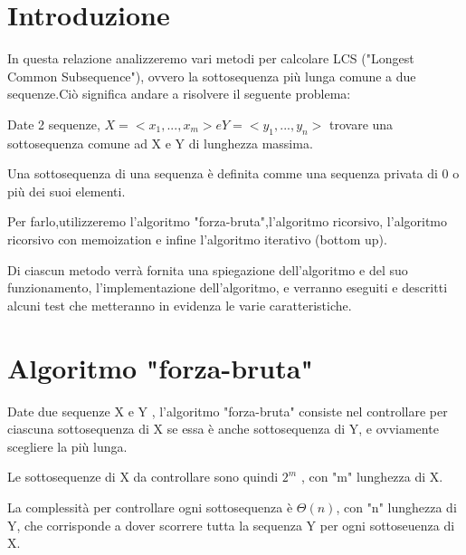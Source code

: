 \documentclass[11pt,a4paper]{article}
\begin{document}
\newcommand{\imageLabel}[4]{ %
	\begin{figure}[h!]
		\centering
		\texttt{[image: \#1]} 
		\caption{#2}
		\label{fig:#4}
	\end{figure}
	\FloatBarrier
}
\renewcommand{\figurename}{Figura}
\renewcommand{\tablename}{Tabella}

\newcommand{\titolo}  {Laboratorio di Algoritmi

e Strutture Dati}
\newcommand{\sottotitolo} {Confronto metodi per calcolare LCS tra due stringhe}
\newcommand{\nome}    {Federico Donati}







\section {Introduzione}
In questa relazione analizzeremo vari metodi per calcolare LCS ("Longest Common Subsequence"), ovvero la sottosequenza più lunga comune a due sequenze.Ciò significa andare a risolvere il seguente problema:

Date 2 sequenze, $X =< x_{1}, . . . , x_{m} > e Y =< y_{1}, . . . , y_{n} >$
trovare una sottosequenza comune ad X e Y di lunghezza massima.

Una sottosequenza di una sequenza è definita comme una sequenza privata di 0 o più dei suoi elementi.

Per farlo,utilizzeremo l'algoritmo "forza-bruta",l'algoritmo ricorsivo, l'algoritmo ricorsivo con memoization e infine l'algoritmo iterativo (bottom up).

Di ciascun metodo verrà fornita una spiegazione dell'algoritmo e del suo funzionamento, l'implementazione dell'algoritmo, e verranno eseguiti e descritti alcuni test che metteranno in evidenza le varie caratteristiche. 

\section {Algoritmo "forza-bruta"}
\label{bruteforce cap}
Date due sequenze X e Y , l'algoritmo "forza-bruta" consiste nel controllare per ciascuna sottosequenza di X se essa è anche sottosequenza di Y, e ovviamente scegliere la più lunga.

Le sottosequenze di X da controllare sono quindi $2^m$ , con "m" lunghezza di X.

La complessità per controllare ogni sottosequenza è $\Theta(n)$, con "n" lunghezza di Y, che corrisponde a dover scorrere tutta la sequenza Y per ogni sottoseuenza di X.
\end{document}
